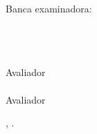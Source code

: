 \makeatletter
\begin{folhadeaprovacao}
	\begin{center}
		{\ABNTEXchapterfont \textbf{\imprimirautor}}
		
		\vspace*{\fill}\vspace*{\fill}
		
		\begin{center}
			\ABNTEXchapterfont \textbf{\imprimirtitulo}
		\end{center}

		\vspace*{\fill}
		\hspace{.45\textwidth}

		\normalfont

		\begin{flushright}
			\begin{minipage}{.55\textwidth}
				\preambuloaprovado
			\end{minipage}%
		\end{flushright}

		\vspace*{\fill}
	\end{center}
		
	\normalfont

	Banca examinadora:

	\begin{center}
		\TratamentoOrientador~\imprimirorientador \\ \imprimirorientadorRotulo \\
		\vspace*{\fill}
		\abntex@ifnotempty{\imprimircoorientador}{
			\TratamentoCoorientador~\imprimircoorientador \\ \imprimircoorientadorRotulo \\ \imprimirinstituicao\\
			\vspace*{\fill}
		}
		\TratamentoExaminadorA~\ExaminadorA \\ Avaliador\\
		\vspace*{\fill}
		\TratamentoExaminadorB~\ExaminadorB \\ Avaliador\\
		\vspace*{\fill}
	\end{center}
	
	\begin{center}
		\vspace*{0.5cm}

		{\imprimirlocal}, \DataBanca.
	\end{center}
\end{folhadeaprovacao}
\makeatother
